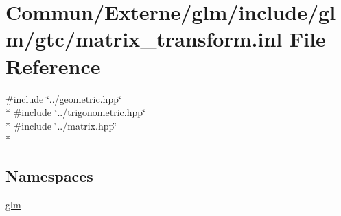 \hypertarget{matrix__transform_8inl}{}\section{Commun/\+Externe/glm/include/glm/gtc/matrix\+\_\+transform.inl File Reference}
\label{matrix__transform_8inl}
{\ttfamily \#include \char`\"{}../geometric.\+hpp\char`\"{}}\\*
{\ttfamily \#include \char`\"{}../trigonometric.\+hpp\char`\"{}}\\*
{\ttfamily \#include \char`\"{}../matrix.\+hpp\char`\"{}}\\*
\subsection*{Namespaces}
\begin{DoxyCompactItemize}
\item 
 \hyperlink{namespaceglm}{glm}
\end{DoxyCompactItemize}
